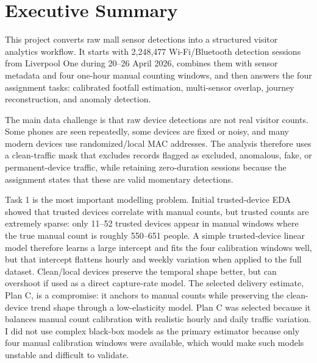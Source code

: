 \documentclass[11pt,a4paper]{article}
\begin{document}
\tableofcontents
\listoffigures
\newpage

\section{Executive Summary}

This project converts raw mall sensor detections into a structured visitor analytics workflow. It starts with 2,248,477 Wi-Fi/Bluetooth detection sessions from Liverpool One during 20--26 April 2026, combines them with sensor metadata and four one-hour manual counting windows, and then answers the four assignment tasks: calibrated footfall estimation, multi-sensor overlap, journey reconstruction, and anomaly detection.

The main data challenge is that raw device detections are not real visitor counts. Some phones are seen repeatedly, some devices are fixed or noisy, and many modern devices use randomized/local MAC addresses. The analysis therefore uses a clean-traffic mask that excludes records flagged as excluded, anomalous, fake, or permanent-device traffic, while retaining zero-duration sessions because the assignment states that these are valid momentary detections.

Task 1 is the most important modelling problem. Initial trusted-device EDA showed that trusted devices correlate with manual counts, but trusted counts are extremely sparse: only 11--52 trusted devices appear in manual windows where the true manual count is roughly 550--651 people. A simple trusted-device linear model therefore learns a large intercept and fits the four calibration windows well, but that intercept flattens hourly and weekly variation when applied to the full dataset. Clean/local devices preserve the temporal shape better, but can overshoot if used as a direct capture-rate model. The selected delivery estimate, Plan C, is a compromise: it anchors to manual counts while preserving the clean-device trend shape through a low-elasticity model. Plan C was selected because it balances manual count calibration with realistic hourly and daily traffic variation. I did not use complex black-box models as the primary estimator because only four manual calibration windows were available, which would make such models unstable and difficult to validate.
\end{document}
